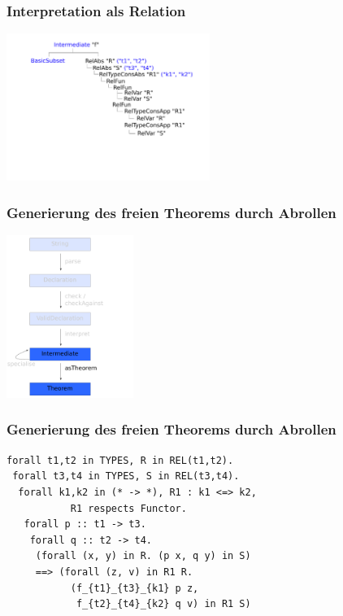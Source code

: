\documentclass{beamer}
\begin{document}

\begin{frame}
\frametitle{Interpretation als Relation}

\begin{center}
\includegraphics[width=250px]{intermediate}
\end{center}

\end{frame}


\begin{frame}
\frametitle{Generierung des freien Theorems durch Abrollen}
\begin{center}
\includegraphics[height=200px]{overview-free-theorems-astheorem}
\end{center}
\end{frame}


\begin{frame}[fragile]
\frametitle{Generierung des freien Theorems durch Abrollen}

\begin{verbatim}
forall t1,t2 in TYPES, R in REL(t1,t2).
 forall t3,t4 in TYPES, S in REL(t3,t4).
  forall k1,k2 in (* -> *), R1 : k1 <=> k2,
           R1 respects Functor.
   forall p :: t1 -> t3.
    forall q :: t2 -> t4.
     (forall (x, y) in R. (p x, q y) in S)
     ==> (forall (z, v) in R1 R.
           (f_{t1}_{t3}_{k1} p z,
            f_{t2}_{t4}_{k2} q v) in R1 S)
\end{verbatim}
\end{frame}
\end{document}
